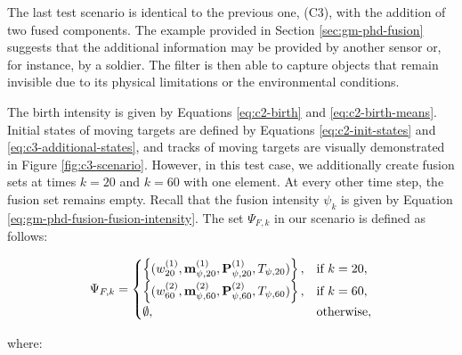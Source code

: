 The last test scenario is identical to the previous one, (C3), with the addition of two fused components. The example provided in Section \ref{sec:gm-phd-fusion} suggests that the additional information may be provided by another sensor or, for instance, by a soldier. The filter is then able to capture objects that remain invisible due to its physical limitations or the environmental conditions.

The birth intensity is given by Equations \ref{eq:c2-birth} and \ref{eq:c2-birth-means}. Initial states of moving targets are defined by Equations \ref{eq:c2-init-states} and \ref{eq:c3-additional-states}, and tracks of moving targets are visually demonstrated in Figure \ref{fig:c3-scenario}. However, in this test case, we additionally create fusion sets at times $k=20$ and $k=60$ with one element. At every other time step, the fusion set remains empty. Recall that the fusion intensity $\psi_k$ is given by Equation \ref{eq:gm-phd-fusion-fusion-intensity}. The set $\Psi_{F,k}$ in our scenario is defined as follows:

\begin{equation}
    \Psi_{F, k} = \begin{cases}
        \left\{ ( w_{20}^{(1)}, \svecat{m}{\psi, 20}{(1)}, \svecat{P}{\psi, 20}{(1)}, T_{\psi, 20} )\right\}, & \text{if } k = 20, \\
        \left\{ ( w_{60}^{(2)}, \svecat{m}{\psi, 60}{(2)}, \svecat{P}{\psi, 60}{(2)}, T_{\psi, 60} )\right\}, & \text{if } k = 60, \\
        \emptyset, & \text{otherwise},
    \end{cases}
\end{equation}

\noindent where: 


